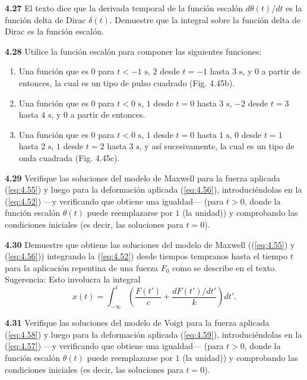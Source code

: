 \documentclass[12pt]{book}
\begin{document}
\textbf{4.27} El texto dice que la derivada temporal de la función escalón $d\theta(t)/dt$ es la función delta de Dirac $\delta(t)$. Demuestre que la integral sobre la función delta de Dirac es la función escalón.

\textbf{4.28} Utilice la función escalón para componer las siguientes funciones:
\begin{enumerate}
  \item[(a)] Una función que es $0$ para $t < -1\text{ s}$, $2$ desde $t = -1$ hasta $3\text{ s}$, y $0$ a partir de entonces, la cual es un tipo de pulso cuadrado (Fig. 4.45b).
  \item[(b)] Una función que es $0$ para $t < 0\text{ s}$, $1$ desde $t = 0$ hasta $3\text{ s}$, $-2$ desde $t = 3$ hasta $4\text{ s}$, y $0$ a partir de entonces.
  \item[(c)] Una función que es $0$ para $t < 0\text{ s}$, $1$ desde $t = 0$ hasta $1\text{ s}$, $0$ desde $t = 1$ hasta $2\text{ s}$, $1$ desde $t = 2$ hasta $3\text{ s}$, y así sucesivamente, la cual es un tipo de onda cuadrada (Fig. 4.45c).
\end{enumerate}

\textbf{4.29} Verifique las soluciones del modelo de Maxwell para la fuerza aplicada (\ref{eq:4.55}) y luego para la deformación aplicada (\ref{eq:4.56}), introduciéndolas en la (\ref{eq:4.52}) ---y verificando que obtiene una igualdad--- (para $t > 0$, donde la función escalón $\theta(t)$ puede reemplazarse por $1$ (la unidad)) y comprobando las condiciones iniciales (es decir, las soluciones para $t = 0$).

\textbf{4.30} Demuestre que obtiene las soluciones del modelo de Maxwell ((\ref{eq:4.55}) y (\ref{eq:4.56})) integrando la (\ref{eq:4.52}) desde tiempos tempranos hasta el tiempo $t$ para la aplicación repentina de una fuerza $F_0$ como se describe en el texto. Sugerencia: Esto involucra la integral
\begin{equation}
x(t) = \int_{-\infty}^{t} \left( \frac{F(t')}{c} + \frac{dF(t')/dt'}{k} \right) dt'.
\label{eq:4.100}
\end{equation}

\textbf{4.31} Verifique las soluciones del modelo de Voigt para la fuerza aplicada (\ref{eq:4.58}) y luego para la deformación aplicada (\ref{eq:4.59}), introduciéndolas en la (\ref{eq:4.57}) ---y verificando que obtiene una igualdad--- (para $t > 0$, donde la función escalón $\theta(t)$ puede reemplazarse por $1$ (la unidad)) y comprobando las condiciones iniciales (es decir, las soluciones para $t = 0$).
\end{document}
